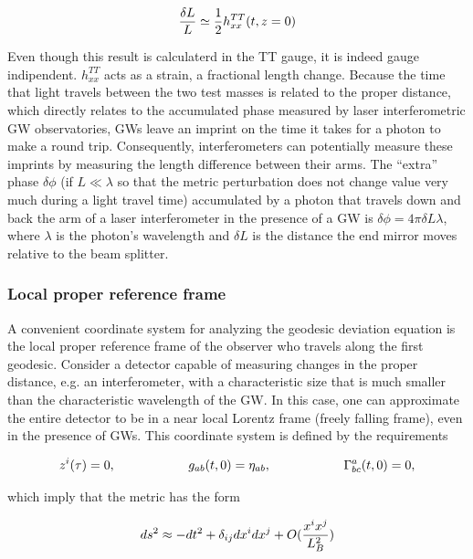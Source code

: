 \documentclass[binding=0.6cm, LaM]{sapthesis}
\begin{document}
		\begin{equation}
		{{\delta L}\over{L}} \simeq {1 \over 2} h_{xx}^{TT}(t,z=0)
		\end{equation}

	Even though this result is calculaterd in the TT gauge, it is indeed gauge indipendent.
	$h_{xx}^{TT}$ acts as a strain, a fractional length change.
	Because the time that light travels between the two test masses is related to the proper distance,  
	which directly relates to the accumulated phase measured by laser interferometric GW observatories,
	GWs leave an imprint on the time it takes for a photon to make a round trip. 
	Consequently, interferometers can potentially measure these imprints by measuring the length difference between
	their arms. The “extra” phase $\delta \phi$ (if $L \ll \lambda$ so that the metric perturbation 
	does not change value very much during a light travel time) accumulated by a photon that travels
	down and back the arm of a laser interferometer in the presence of a GW is $\delta \phi = 4\pi \delta L \lambda$, 
	where $\lambda$ is the photon’s wavelength and $\delta L$ is the distance
	the end mirror moves relative to the beam splitter.


\subsubsection{Local proper reference frame}

	A convenient coordinate system for analyzing the geodesic deviation equation is the 
	local proper reference frame of the observer who travels along the first geodesic.
	Consider a detector capable of measuring changes in the proper distance, e.g. an interferometer, 
	with a characteristic size that is much smaller than the characteristic wavelength of the GW.
	In this case, one can approximate the entire detector to be in a near local Lorentz frame  
	(freely falling frame), even in the presence of GWs. This coordinate system is defined by the requirements

		\begin{equation}
		z^i(\tau) = 0, \hspace*{2cm} g_{ab}(t, 0) = \eta_{ab}, \hspace*{2cm} \Gamma^a_{bc}(t,0) = 0,
		\end{equation}

	which imply that the metric has the form

		\begin{equation}
		ds^2 \approx -dt^2 + \delta_{ij}dx^i dx^j + O({{x^ix^j}\over{L^2_B}})
		\end{equation}
\end{document}
